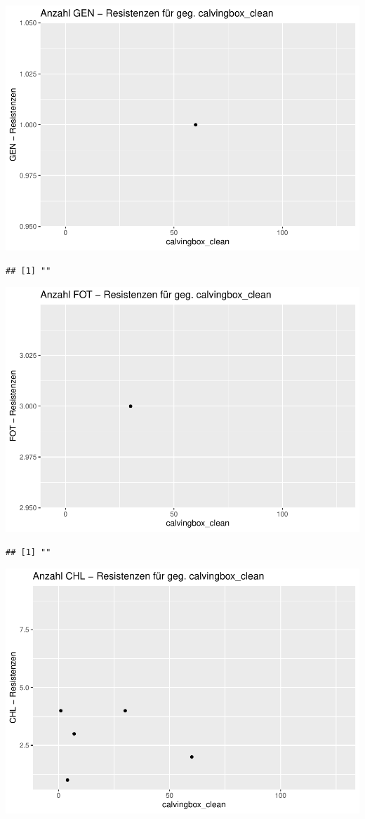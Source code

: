 \documentclass[
]{article}
\begin{document}
\includegraphics{NResistenzen_files/figure-latex/unnamed-chunk-6-24.pdf}

\begin{verbatim}
## [1] ""
\end{verbatim}

\includegraphics{NResistenzen_files/figure-latex/unnamed-chunk-6-25.pdf}

\begin{verbatim}
## [1] ""
\end{verbatim}

\includegraphics{NResistenzen_files/figure-latex/unnamed-chunk-6-26.pdf}
\end{document}
